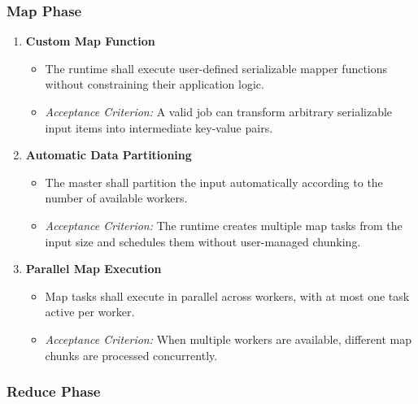 \documentclass{scrartcl}
\begin{document}
\subsubsection{Map Phase}

\begin{enumerate}[label=\textbf{FR-MAP-\arabic*}]
    \item \textbf{Custom Map Function}
          \begin{itemize}
              \item The runtime shall execute user-defined serializable mapper functions without constraining their application logic.
              \item \textit{Acceptance Criterion:} A valid job can transform arbitrary serializable input items into intermediate key-value pairs.
          \end{itemize}

    \item \textbf{Automatic Data Partitioning}
          \begin{itemize}
              \item The master shall partition the input automatically according to the number of available workers.
              \item \textit{Acceptance Criterion:} The runtime creates multiple map tasks from the input size and schedules them without user-managed chunking.
          \end{itemize}

    \item \textbf{Parallel Map Execution}
          \begin{itemize}
              \item Map tasks shall execute in parallel across workers, with at most one task active per worker.
              \item \textit{Acceptance Criterion:} When multiple workers are available, different map chunks are processed concurrently.
          \end{itemize}
\end{enumerate}

\subsubsection{Reduce Phase}
\end{document}
